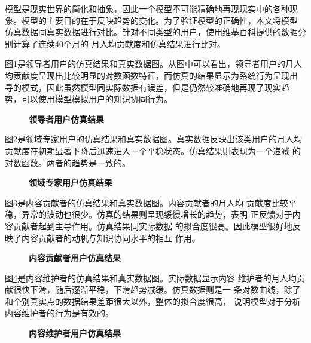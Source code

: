 模型是现实世界的简化和抽象，因此一个模型不可能精确地再现现实中的各种现
象。模型的主要目的在于反映趋势的变化。为了验证模型的正确性，本文将模型
仿真数据同真实数据进行对比。针对不同类型的用户，使用维基百科提供的数据分别计算了连续40个月的
月人均贡献度和仿真结果进行比对。

图\ref{fig:simu1}是领导者用户的仿真结果和真实数据图。从图中可以看出，领导者用户的月人
均贡献度呈现出比较明显的对数函数特征，而仿真的结果显示为系统行为呈现出
寻的模式，因此虽然模型同实际数据有误差，但是仍然较准确地再现了现实趋
势，可以使用模型模拟用户的知识协同行为。

\begin{figure}[!htb]
  \centering
 
 \caption{\small{\textbf{领导者用户仿真结果}}}
  \label{fig:simu1}
\end{figure}

图\ref{fig:simu2}是领域专家用户的仿真结果和真实数据图。真实数据反映出该类用户的月人均
贡献度在初期显著下降后迅速进入一个平稳状态。仿真结果则表现为一个递减
的对数函数。两者的趋势是一致的。

\begin{figure}[!htb]
  \centering
  
 \caption{\small{\textbf{领域专家用户仿真结果}}}
  \label{fig:simu2}
\end{figure}

图\ref{fig:simu3}是内容贡献者的仿真结果和真实数据图。内容贡献者的月人均
贡献度比较平稳，异常的波动也很少。仿真的结果则呈现缓慢增长的趋势，表明
正反馈对于内容贡献者起到主导作用。仿真结果同实际数据
的拟合度很高。因此模型很好地反映了内容贡献者的动机与知识协同水平的相互
作用。

\begin{figure}[!htb]
  \centering
  
  \caption{\small{\textbf{内容贡献者用户仿真结果}}}
  \label{fig:simu3}
\end{figure}

图\ref{fig:simu4}是内容维护者的仿真结果和真实数据图。实际数据显示内容
维护者的月人均贡献很快下滑，随后逐渐平稳，下滑趋势减缓。仿真数据则是一
条对数曲线，除了和个别真实点的数据结果差距很大以外，整体的拟合度很高，
说明模型对于分析内容维护者的行为是有效的。
\begin{figure}[!htb]
  \centering
    
  \caption{\small{\textbf{内容维护者用户仿真结果}}}
  \label{fig:simu4}
\end{figure}

